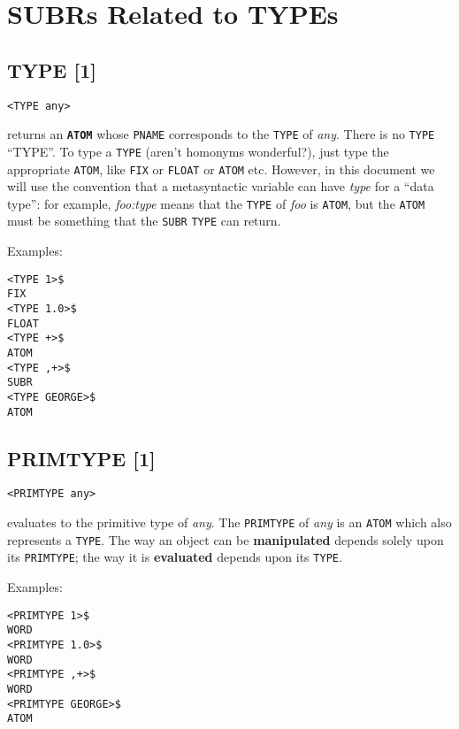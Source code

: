 \documentclass[a4paper]{scrbook}
\begin{document}
\section{SUBRs Related to TYPEs}\label{subrs-related-to-types}

\subsection{TYPE {[}1{]}}\label{type-1}

\begin{verbatim}
<TYPE any>
\end{verbatim}

 returns an \textbf{\texttt{ATOM}} whose \texttt{PNAME} corresponds to the \texttt{TYPE} of
\emph{any}. There is no \texttt{TYPE} ``TYPE''. To type a \texttt{TYPE} (aren't homonyms wonderful?), just type the
appropriate \texttt{ATOM}, like \texttt{FIX} or \texttt{FLOAT} or \texttt{ATOM} etc. However, in this document we will use
the convention that a metasyntactic variable can have \emph{type} for a ``data type'': for example, \emph{foo:type} means
that the \texttt{TYPE} of \emph{foo} is \texttt{ATOM}, but the \texttt{ATOM} must be something that the \texttt{SUBR}
\texttt{TYPE} can return.

Examples:

\begin{verbatim}
<TYPE 1>$
FIX
<TYPE 1.0>$
FLOAT
<TYPE +>$
ATOM
<TYPE ,+>$
SUBR
<TYPE GEORGE>$
ATOM
\end{verbatim}

\subsection{PRIMTYPE {[}1{]}}\label{primtype-1}

\begin{verbatim}
<PRIMTYPE any>
\end{verbatim}

 evaluates to the primitive type of \emph{any}. The \texttt{PRIMTYPE} of \emph{any} is an
\texttt{ATOM} which also represents a \texttt{TYPE}. The way an object can be \textbf{manipulated} depends solely upon its
\texttt{PRIMTYPE}; the way it is \textbf{evaluated} depends upon its \texttt{TYPE}.

Examples:

\begin{verbatim}
<PRIMTYPE 1>$
WORD
<PRIMTYPE 1.0>$
WORD
<PRIMTYPE ,+>$
WORD
<PRIMTYPE GEORGE>$
ATOM
\end{verbatim}
\end{document}
